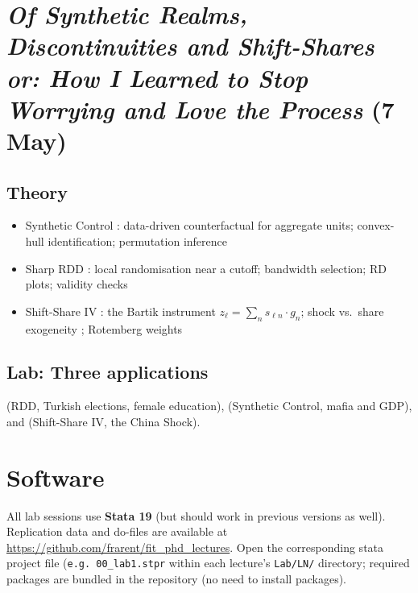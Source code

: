 \documentclass[11pt, a4paper]{article}
\begin{document}
\section{\textit{Of Synthetic Realms, Discontinuities and Shift-Shares or: How I Learned to Stop Worrying and Love the Process} (7 May)}

\subsection*{Theory}

\begin{itemize}[leftmargin=1.4em, itemsep=2pt]
  \item Synthetic Control \citep{abadie2010}: data-driven counterfactual
        for aggregate units; convex-hull identification; permutation inference
  \item Sharp RDD \citep{cattaneo2019}: local randomisation near a cutoff;
        bandwidth selection; RD plots; validity checks
  \item Shift-Share IV \citep{bartik1991}: the Bartik instrument
        $z_\ell = \sum_n s_{\ell n} \cdot g_n$; shock vs.\ share exogeneity
        \citep{borusyak2022,goldsmithpinkham2020}; Rotemberg weights
\end{itemize}

\subsection*{Lab: Three applications}

\citet{meyersson2014} (RDD, Turkish elections, female education),
\citet{pinotti2015} (Synthetic Control, mafia and GDP),
and \citet{autor2013} (Shift-Share IV, the China Shock).

\section*{Software}

All lab sessions use \textbf{Stata 19} (but should work in previous versions as well). Replication data and do-files are
available at \url{https://github.com/frarent/fit_phd_lectures}.
Open the corresponding stata project file (\texttt{e.g. 00\_lab1.stpr} within each lecture's \texttt{Lab/LN/}
directory; required packages are bundled in the repository (no need to install packages).



\end{document}
